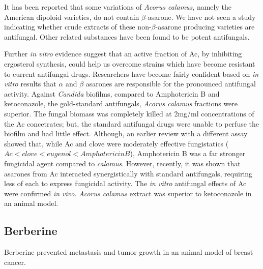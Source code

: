 \documentclass[twocolumn]{article}
\begin{document}
It has been reported that some variations of \textit{Acorus calamus},
namely the American dipoloid varieties,
do not contain $\beta$-asarone.
\cite{phongpaichit2005antimicrobial}
We have not seen a study indicating whether crude extracts
of these non-$\beta$-asarone producing varieties are antifungal.
Other related substances have been found to be potent antifungals.
\cite{rajput2013anti}

Further \textit{in vitro} evidence suggest that
an active fraction of Ac,
by inhibiting ergosterol synthesis,
could help us overcome strains which have become
resistant to current antifungal drugs.
\cite{
subha2008effect,
subha2009vitro
}
Researchers have become fairly confident based on \textit{in vitro}
results that $\alpha$ and $\beta$ asarones are responsible for
the pronounced antifungal activity.
\cite{devi2009antimicrobial}
Against \textit{Candida} biofilms,
compared to Amphotericin B and ketoconazole, the gold-standard antifungals,
\textit{Acorus calamus} fractions were superior.
The fungal biomass was completely killed at 2mg/ml concentrations
of the Ac concetrates; but, the standard antifungal drugs
were unable to perfuse the biofilm and had little effect.
\cite{subha2009candida}
Although, an earlier review with a different assay
showed that, while Ac and clove were moderately effective fungistatics
($Ac < clove < eugenol < Amphotericin B$),
Amphotericin B was a far stronger fungicidal agent
compared to \textit{calamus}.
\cite{thirach2003antifungal}
However, recently,
it was shown that asarones from Ac interacted
synergistically with standard antifungals,
requiring less of each to express fungicidal activity.
\cite{kumar2015asarones}
The \textit{in vitro} antifungal effects of Ac
were confirmed \textit{in vivo}.
\textit{Acorus calamus} extract
was superior to ketoconazole in an animal model.
\cite{subha2009combating}








\subsection{Berberine}



Berberine prevented metastasis and tumor growth in
an animal model of breast cancer.
\cite{refaat2013berberine}
\end{document}
